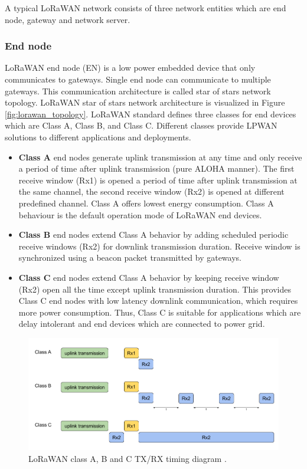 A typical LoRaWAN network consists of three network entities which are end node, gateway and network server.

\subsubsection{End node}

LoRaWAN end node (EN) is a low power embedded device that only communicates to gateways. Single end node can communicate to multiple gateways. This communication architecture is called star of stars network topology. LoRaWAN star of stars network architecture is visualized in Figure \ref{fig:lorawan_topology}. LoRaWAN standard defines three classes for end devices which are Class A, Class B, and Class C. Different classes provide LPWAN solutions to different applications and deployments.

\begin{itemize}
  \item \textbf{Class A} end nodes generate uplink transmission at any time and only receive a period of time after uplink transmission (pure ALOHA manner). The first receive window (Rx1) is opened a period of time after uplink transmission at the same channel, the second receive window (Rx2) is opened at different predefined channel. Class A offers lowest energy consumption. Class A behaviour is the default operation mode of LoRaWAN end devices.
  \item \textbf{Class B} end nodes extend Class A behavior by adding scheduled periodic receive windows (Rx2) for downlink transmission duration. Receive window is synchronized using a beacon packet transmitted by gateways.
  \item \textbf{Class C} end nodes extend Class A behavior by keeping receive window (Rx2) open all the time except uplink transmission duration. This provides Class C end nodes with low latency downlink communication, which requires more power consumption. Thus, Class C is suitable for applications which are delay intolerant and end devices which are connected to power grid.
\end{itemize}

\begin{figure}
\centering
\includegraphics[width=\linewidth]{fig/lorawan_class.png}
\vspace*{4mm}
\caption{LoRaWAN class A, B and C TX/RX timing diagram \cite{witekio}.}
\label{fig:lorawan_class}
\end{figure}

